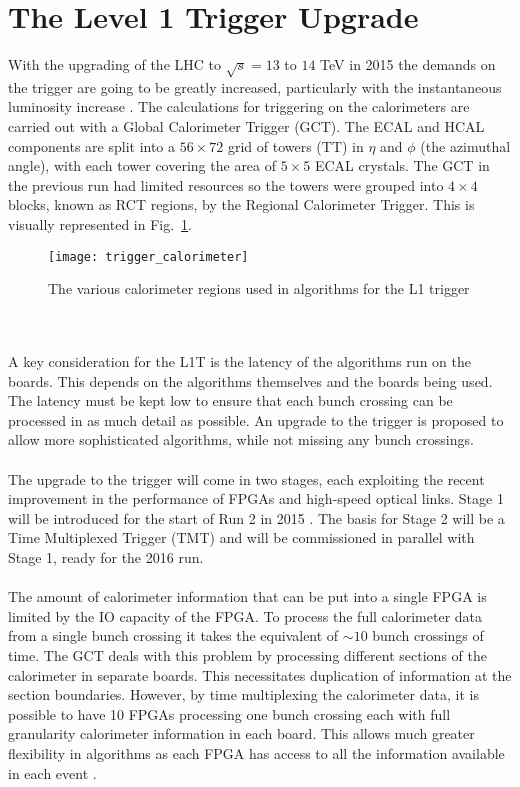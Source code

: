 
\section{The Level 1 Trigger Upgrade}
\label{sec:triggerupgrade}

With the upgrading of the LHC to $\sqrt{s}=13$ to $14$ TeV in 2015 the demands on the trigger are going to be greatly increased, particularly with the instantaneous luminosity increase \cite{TriggerTDR_Tapper:2013yva}. The calculations for triggering on the calorimeters are carried out with a Global Calorimeter Trigger (GCT). The ECAL and HCAL components are split into a $56\times 72$ grid of towers (TT) in $\eta$ and $\phi$ (the azimuthal angle), with each tower covering the area of $5\times5$ ECAL crystals. The GCT in the previous run had limited resources so the towers were grouped into $4\times4$ blocks, known as RCT regions, by the Regional Calorimeter Trigger. This is visually represented in Fig.~\ref{fig:trigger_calorimeter}.
\begin{figure}
	\begin{center}
		\texttt{[image: trigger\_calorimeter]}
	\end{center}
	\caption{The various calorimeter regions used in algorithms for the L1 trigger}
	\label{fig:trigger_calorimeter}
\end{figure}
\\\\
A key consideration for the L1T is the latency of the algorithms run on the boards. This depends on the algorithms themselves and the boards being used. The latency must be kept low to ensure that each bunch crossing can be processed in as much detail as possible. An upgrade to the trigger is proposed to allow more sophisticated algorithms, while not missing any bunch crossings.
\\\\
\noindent The upgrade to the trigger will come in two stages, each exploiting the recent improvement in the performance of FPGAs and high-speed optical links. Stage 1 will be introduced for the start of Run 2 in 2015 \cite{UCT-TDR}. The basis for Stage 2 will be a Time Multiplexed Trigger (TMT) and will be commissioned in parallel with Stage 1, ready for the 2016 run. 
\\\\
The amount of calorimeter information that can be put into a single FPGA is limited by the IO capacity of the FPGA. To process the full calorimeter data from a single bunch crossing it takes the equivalent of $\sim10$ bunch crossings of time. The GCT deals with this problem by processing different sections of the calorimeter in separate boards. This necessitates duplication of information at the section boundaries. However, by time multiplexing the calorimeter data, it is possible to have 10 FPGAs processing one bunch crossing each with full granularity calorimeter information in each board. This allows much greater flexibility in algorithms as each FPGA has access to all the information available in each event \cite{Baber1_2013} \cite{TMTdemo2012}.
